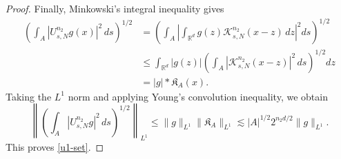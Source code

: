 \documentclass[10pt,a4paper]{amsart}
\begin{document}
\begin{proof}
		Finally, Minkowski's integral inequality gives
		\begin{align*}
			\left(
			\int_A
			|U_{s,N}^{n_2}g(x)|^2\,ds
			\right)^{1/2}
			&=
			\left(
			\int_A
			\left|
			\int_{\mathbb R^d}
			g(z)\mathcal K_{s,N}^{n_2}(x-z)\,dz
			\right|^2
			ds
			\right)^{1/2}
			\\
			&\leq
			\int_{\mathbb R^d}
			|g(z)|
			\left(
			\int_A
			|\mathcal K_{s,N}^{n_2}(x-z)|^2\,ds
			\right)^{1/2}
			dz
			\\
			&=
			|g|*\mathfrak K_A(x).
		\end{align*}
		Taking the \(L^1\) norm and applying Young's convolution
		inequality, we obtain
		\[
		\left\|
		\left(
		\int_A |U_{s,N}^{n_2}g|^2\,ds
		\right)^{1/2}
		\right\|_{L^1}
		\leq
		\|g\|_{L^1}\|\mathfrak K_A\|_{L^1}
		\lesssim
		|A|^{1/2}2^{n_2d/2}\|g\|_{L^1}.
		\]
		This proves \eqref{u1-set}.
	\end{proof}
\end{document}
